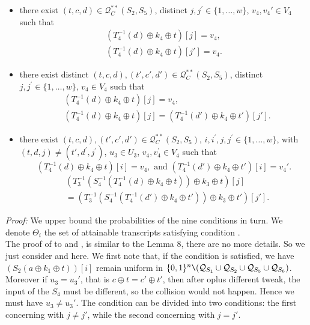\begin{itemize}
$$$$
  \item[\hseven]
  there exist $(t, c, d) \in \mathcal{Q}_{C}^{**}\left(S_{2}, S_{5}\right)$, distinct $j, j^{\prime}\in\{1, \ldots, w\}$, $v_{4},v_{4}' \in V_{4}$ such that
  $$
  \begin{aligned}  
 \left(T_{4}^{-1}\left(d \right) \oplus k_{4} \oplus t\right)[j] = v_4, \\
  \left(T_{4}^{-1}\left(d \right) \oplus k_{4} \oplus t\right)[j'] = v_4.
  \end{aligned}
  $$
  \item[\height]
  there exist distinct $(t, c, d),(t', c', d') \in \mathcal{Q}_{C}^{**}\left(S_{2}, S_{5}\right)$, distinct $j, j^{\prime}\in\{1, \ldots, w\}$, $v_{4} \in V_{4}$ such that
  $$
  \begin{aligned}
  &\left(T_{4}^{-1}\left(d \right) \oplus k_{4} \oplus t\right)[j] = v_4, \\
  &\left(T_{4}^{-1}\left(d \right) \oplus k_{4} \oplus t\right)[j] = \left(T_{4}^{-1}\left(d' \right) \oplus k_{4} \oplus t'\right)[j'].
  \end{aligned}
  $$
  \item[\hnine]
  there exist $(t, c, d), (t', c', d') \in \mathcal{Q}_{C}^{**}\left(S_{2}, S_{5}\right)$, $i, i^{\prime}, j, j^{\prime} \in\{1, \ldots, w\}$, with$(t, d, j) \neq \left(t', d^{\prime}, j^{\prime}\right)$, $u_{3} \in U_{3}$, $v_{4},v_{4}^{\prime} \in V_{4}$ such that 
  $$
 \left(T_{4}^{-1}\left(d \right) \oplus k_{4} \oplus t\right)[i] = v_4, \text{ and }
  \left(T_{4}^{-1}\left(d' \right) \oplus k_{4} \oplus t'\right)[i] = v_4'. $$ 
  $$
\begin{aligned}
  &\left(T_{3}^{-1}\left(S_{4}^{-1}\left(T_{4}^{-1}\left(d\right) \oplus k_{4} \oplus t\right)\right) \oplus k_{3} \oplus t\right)[j] \\
  &=  \left(T_{3}^{-1}\left(S_{4}^{-1}\left(T_{4}^{-1}\left(d'\right) \oplus k_{4} \oplus t'\right)\right) \oplus k_{3} \oplus t'\right)[j'].
\end{aligned}
$$
\end{itemize}

\noindent \emph{Proof:} We upper bound the probabilities of the nine conditions in turn. We denote $\Theta_i$ the set of attainable transcripts satisfying condition \hi.\\

The proof of \hone to \hfive and \hseven , \height is similar to the Lemma 8, there are no more details. So we just consider \hsix and \hnine here. We first note that, if the condition is satisfied, we have $\left(S_{2}\left(a \oplus k_{1} \oplus t\right)\right)[i]$ remain uniform in $\{0, 1\}^{n} \verb|\| (\mathcal{Q}_{S_{1}} \cup \mathcal{Q}_{S_{2}} \cup \mathcal{Q}_{S_{5}} \cup \mathcal{Q}_{S_{6}})$.  Moreover if $u_3 =u_3'$, that is $c \oplus t=c' \oplus t'$, then after oplus different tweak, the input of the $S_4$ must be different, so the collision would not happen. Hence we must have $u_3 \neq u_3'$. The condition can be divided into two conditions: the first concerning with $j\neq j'$, while the second concerning with $j=j'$.

